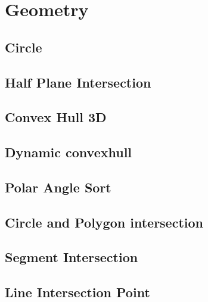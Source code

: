 \documentclass[a4paper,10pt,twocolumn,oneside]{article}
\begin{document}
\section{Geometry}
\subsection{Circle}


\subsection{Half Plane Intersection}


%

\subsection{Convex Hull 3D}


\subsection{Dynamic convexhull}


\subsection{Polar Angle Sort}


\subsection{Circle and Polygon intersection}


\subsection{Segment Intersection}


\subsection{Line Intersection Point}

\end{document}
